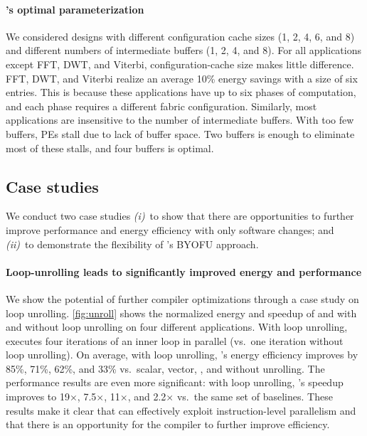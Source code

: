 \paragraph{\snafu's optimal parameterization}
We considered designs with different configuration cache sizes (1, 2, 4, 6, and 8) and different numbers of intermediate buffers (1, 2, 4, and 8).
% 
For all applications except FFT, DWT, and Viterbi, configuration-cache size makes little difference.
% 
FFT, DWT, and Viterbi realize an average 10\% energy savings with a size of six entries.
% 
This is because these applications have up to six phases of computation, and each phase requires a different fabric configuration.
%
Similarly, most applications are insensitive to the number of intermediate buffers.
%
With too few buffers, PEs stall due to lack of buffer space.
%
Two buffers is enough to eliminate most of these stalls, and four buffers is optimal. 

\subsection{Case studies}
We conduct two case studies \emph{(i)}~to show that there are opportunities to further improve performance and energy efficiency with only software changes; and \emph{(ii)}~to demonstrate the flexibility of \snafuframe's BYOFU approach.

\figSNAFUScratchResults
\figSNAFUAccel %

\paragraph{Loop-unrolling leads to significantly improved energy and performance}
We show the potential of further compiler optimizations through a case study on loop unrolling.
%
\autoref{fig:unroll} shows the normalized energy and speedup of \manic and \snafuarch with and without loop unrolling on four different applications.
%
With loop unrolling, \snafuarch executes four iterations of an inner loop in parallel (vs.\ one iteration without loop unrolling).
% 
On average, with loop unrolling, \snafuarch's energy efficiency improves by 85\%, 71\%, 62\%, and 33\% vs.\ scalar, vector, \manic, and \snafuarch without unrolling.
% 
The performance results are even more significant: with loop unrolling, \snafuarch's speedup improves to 19$\times$, 7.5$\times$, 11$\times$, and 2.2$\times$ vs.\
the same set of baselines.
%
These results make it clear that \snafuarch can effectively exploit instruction-level parallelism and that there is an opportunity for the compiler to further improve efficiency.

